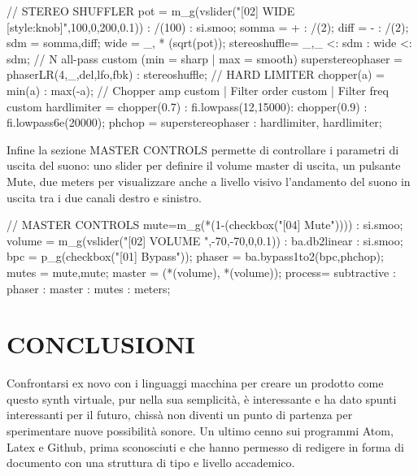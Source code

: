 \documentclass[
	a4paper,
	twocolumn
	]{article}
\begin{document}
// STEREO SHUFFLER
pot = m_g(vslider("[02] WIDE [style:knob]",100,0,200,0.1)) : /(100) : si.smoo;
somma = + : /(2);
diff = - : /(2);
sdm = somma,diff;
wide = _, * (sqrt(pot));
stereoshuffle= _,_ <: sdm : wide <: sdm;
// N all-pass custom (min = sharp | max = smooth)
superstereophaser = phaserLR(4,_,del,lfo,fbk) : stereoshuffle;
// HARD LIMITER
chopper(a) = min(a) : max(-a);
// Chopper amp custom | Filter order custom | Filter freq custom
hardlimiter = chopper(0.7) : fi.lowpass(12,15000): chopper(0.9)
				: fi.lowpass6e(20000);
phchop = superstereophaser : hardlimiter, hardlimiter;

Infine la sezione MASTER CONTROLS permette di controllare i parametri di uscita
del suono: uno slider per definire il volume master di uscita, un pulsante Mute,
due meters per visualizzare anche a livello visivo l'andamento del suono in
uscita tra i due canali destro e sinistro.

// MASTER CONTROLS
mute=m_g(*(1-(checkbox("[04] Mute")))) : si.smoo;
volume = m_g(vslider("[02] VOLUME ",-70,-70,0,0.1)) : ba.db2linear : si.smoo;
bpc = p_g(checkbox("[01] Bypass"));
phaser = ba.bypass1to2(bpc,phchop);
mutes = mute,mute;
master = (*(volume), *(volume));
process= subtractive : phaser : master : mutes : meters;


\section*{CONCLUSIONI}

Confrontarsi ex novo con i linguaggi macchina per creare un prodotto come questo
synth virtuale, pur nella sua semplicità, è interessante e ha dato spunti
interessanti per il futuro, chissà non diventi un punto di partenza per
sperimentare nuove possibilità sonore. Un ultimo cenno sui programmi Atom, Latex
e Github, prima sconosciuti e che hanno permesso di redigere in forma di
documento con una struttura di tipo e livello accademico.
\end{document}
